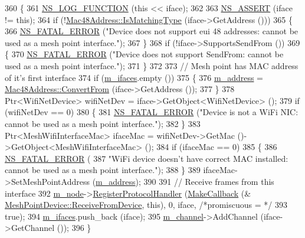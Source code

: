 \begin{DoxyCode}
360 \{
361   \hyperlink{log-macros-disabled_8h_a90b90d5bad1f39cb1b64923ea94c0761}{NS\_LOG\_FUNCTION} (\textcolor{keyword}{this} << iface);
362 
363   \hyperlink{assert_8h_a6dccdb0de9b252f60088ce281c49d052}{NS\_ASSERT} (iface != \textcolor{keyword}{this});
364   \textcolor{keywordflow}{if} (!\hyperlink{classns3_1_1Mac48Address_a55cc1e3c6aa63fd1a4f8f7d9be4ae182}{Mac48Address::IsMatchingType} (iface->GetAddress ()))
365     \{
366       \hyperlink{group__fatal_ga5131d5e3f75d7d4cbfd706ac456fdc85}{NS\_FATAL\_ERROR} (\textcolor{stringliteral}{"Device does not support eui 48 addresses: cannot be used as a mesh
       point interface."});
367     \}
368   \textcolor{keywordflow}{if} (!iface->SupportsSendFrom ())
369     \{
370       \hyperlink{group__fatal_ga5131d5e3f75d7d4cbfd706ac456fdc85}{NS\_FATAL\_ERROR} (\textcolor{stringliteral}{"Device does not support SendFrom: cannot be used as a mesh point
       interface."});
371     \}
372 
373   \textcolor{comment}{// Mesh point has MAC address of it's first interface}
374   \textcolor{keywordflow}{if} (\hyperlink{classns3_1_1MeshPointDevice_a651ebd5660f380c261cd9a055a95805d}{m\_ifaces}.empty ())
375     \{
376       \hyperlink{classns3_1_1MeshPointDevice_abdd42cdf967d3b75cc32e20f74e10c51}{m\_address} = \hyperlink{classns3_1_1Mac48Address_a911ce13603a9ef837545a032b6523ae4}{Mac48Address::ConvertFrom} (iface->GetAddress ());
377     \}
378   Ptr<WifiNetDevice> wifiNetDev = iface->GetObject<WifiNetDevice> ();
379   \textcolor{keywordflow}{if} (wifiNetDev == 0)
380     \{
381       \hyperlink{group__fatal_ga5131d5e3f75d7d4cbfd706ac456fdc85}{NS\_FATAL\_ERROR} (\textcolor{stringliteral}{"Device is not a WiFi NIC: cannot be used as a mesh point interface."});
382     \}
383   Ptr<MeshWifiInterfaceMac> ifaceMac = wifiNetDev->GetMac ()->GetObject<MeshWifiInterfaceMac> ();
384   \textcolor{keywordflow}{if} (ifaceMac == 0)
385     \{
386       \hyperlink{group__fatal_ga5131d5e3f75d7d4cbfd706ac456fdc85}{NS\_FATAL\_ERROR} (
387         \textcolor{stringliteral}{"WiFi device doesn't have correct MAC installed: cannot be used as a mesh point interface."});
388     \}
389   ifaceMac->SetMeshPointAddress (\hyperlink{classns3_1_1MeshPointDevice_abdd42cdf967d3b75cc32e20f74e10c51}{m\_address});
390 
391   \textcolor{comment}{// Receive frames from this interface}
392   \hyperlink{classns3_1_1MeshPointDevice_a2da4f2175aa00207f0acd0712f815796}{m\_node}->\hyperlink{classns3_1_1Node_af713f0e7ea5c49b4fa0b3613405c45fa}{RegisterProtocolHandler} (\hyperlink{group__makecallbackmemptr_ga9376283685aa99d204048d6a4b7610a4}{MakeCallback} (&
      \hyperlink{classns3_1_1MeshPointDevice_a4d34699068f61ebcbb610c650b28af6b}{MeshPointDevice::ReceiveFromDevice}, \textcolor{keyword}{this}), 0, iface, \textcolor{comment}{/*promiscuous = */}
393                                    \textcolor{keyword}{true});
394   \hyperlink{classns3_1_1MeshPointDevice_a651ebd5660f380c261cd9a055a95805d}{m\_ifaces}.push\_back (iface);
395   \hyperlink{classns3_1_1MeshPointDevice_a56185011f8d2654cf842a6273e9e398e}{m\_channel}->AddChannel (iface->GetChannel ());
396 \}
\end{DoxyCode}


